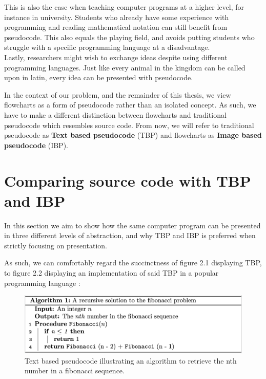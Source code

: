 This is also the case when teaching computer programs at a higher level, for instance in university. Students who already have some experience with programming and reading mathematical notation can still benefit from pseudocode. This also equals the playing field, and avoids putting students who struggle with a specific programming language at a disadvantage. \hfill \\

Lastly, researchers might wish to exchange ideas despite using different programming languages. Just like every animal in the kingdom can be called upon in latin, every idea can be presented with pseudocode. \hfill \\


In the context of our problem, and the remainder of this thesis, we view flowcharts as a form of pseudocode rather than an isolated concept. As such, we have to make a different distinction between flowcharts and traditional pseudocode which resembles source code. From now, we will refer to traditional pseudocode as \textbf{Text based pseudocode} (TBP) and flowcharts as \textbf{Image based pseudocode} (IBP).



\section{Comparing source code with TBP and IBP}

In this section we aim to show how the same computer program can be presented in three different levels of abstraction, and why TBP and IBP is preferred when strictly focusing on presentation. \\




As such, we can comfortably regard the succinctness of figure 2.1 displaying TBP, to figure 2.2 displaying an implementation of said TBP in a popular programming language \cite{javaIsAPopularProgrammingLanguage}:

\begin{figure}[ht]
    \centering
    \includegraphics[scale=0.46]{assets/fibonacci_pseudo1.png}
    \caption{Text based pseudocode illustrating an algorithm to retrieve the nth number in a fibonacci sequence.}
    \label{fig:fibseq2}
\end{figure}

